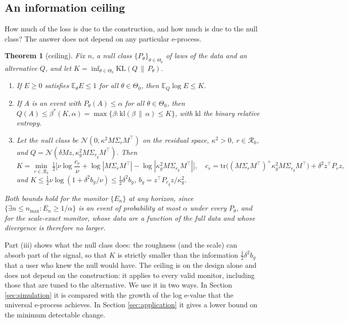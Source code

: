 \documentclass[11pt]{article}
\theoremstyle{plain}
\newtheorem{theorem}{Theorem}
\theoremstyle{definition}
\newcommand{\E}{\mathbb{E}}
\begin{document}
\subsection{An information ceiling}
\label{sec:ceiling}

How much of the loss is due to the construction, and how much is due to the null class? The answer does not depend on any particular e-process.

\begin{theorem}[ceiling]
\label{thm:ceiling}
Fix $n$, a null class $\{P_\theta\}_{\theta\in\Theta_0}$ of laws of the data and an alternative $Q$, and let $K = \inf_{\theta\in\Theta_0}\mathrm{KL}(Q\,\|\,P_\theta)$.
\begin{enumerate}
\item[(i)] If $E\ge0$ satisfies $\E_\theta E \le 1$ for all $\theta \in \Theta_0$, then $\E_Q\log E \le K$.
\item[(ii)] If $A$ is an event with $P_\theta(A)\le\alpha$ for all $\theta\in\Theta_0$, then $Q(A) \le \beta^*(K,\alpha) = \max\{\beta : \mathrm{kl}(\beta\,\|\,\alpha) \le K\}$, with $\mathrm{kl}$ the binary relative entropy.
\item[(iii)] Let the null class be $\mathcal{N}(0,\kappa^2 M\Sigma_r M^\top)$ on the residual space, $\kappa^2>0$, $r\in\mathcal{R}_0$, and $Q = \mathcal{N}(\delta Mz,\kappa_g^2M\Sigma_{r_g}M^\top)$. Then
\[
K = \min_{r\in\mathcal{R}_0}\ \tfrac12\Big[\nu\log\frac{c_r}{\nu} + \log|M\Sigma_rM^\top| - \log|\kappa_g^2M\Sigma_{r_g}M^\top|\Big],\quad c_r = \mathrm{tr}\big((M\Sigma_rM^\top)^{+}\kappa_g^2M\Sigma_{r_g}M^\top\big)+\delta^2z^\top P_rz,
\]
and $K \le \tfrac12\nu\log(1+\delta^2 b_{g}/\nu) \le \tfrac12\delta^2 b_g$, $b_g = z^\top P_{r_g}z/\kappa_g^2$.
\end{enumerate}
Both bounds hold for the monitor $\{E_n\}$ at any horizon, since $\{\exists n\le n_{\max}: E_n\ge1/\alpha\}$ is an event of probability at most $\alpha$ under every $P_\theta$, and for the scale-exact monitor, whose data are a function of the full data and whose divergence is therefore no larger.
\end{theorem}

Part (iii) shows what the null class does: the roughness (and the scale) can absorb part of the signal, so that $K$ is strictly smaller than the information $\tfrac12\delta^2b_g$ that a user who knew the null would have. The ceiling is on the design alone and does not depend on the construction: it applies to every valid monitor, including those that are tuned to the alternative. We use it in two ways. In Section \ref{sec:simulation} it is compared with the growth of the log e-value that the universal e-process achieves. In Section \ref{sec:application} it gives a lower bound on the minimum detectable change.
\end{document}
